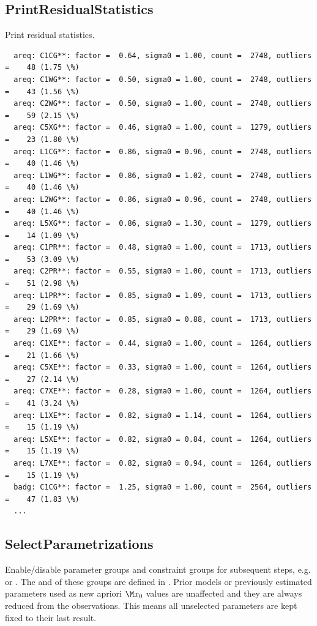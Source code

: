 \subsection{PrintResidualStatistics}\label{gnssProcessingStepType:printResidualStatistics}
Print residual statistics.
\begin{verbatim}
  areq: C1CG**: factor =  0.64, sigma0 = 1.00, count =  2748, outliers =    48 (1.75 \%)
  areq: C1WG**: factor =  0.50, sigma0 = 1.00, count =  2748, outliers =    43 (1.56 \%)
  areq: C2WG**: factor =  0.50, sigma0 = 1.00, count =  2748, outliers =    59 (2.15 \%)
  areq: C5XG**: factor =  0.46, sigma0 = 1.00, count =  1279, outliers =    23 (1.80 \%)
  areq: L1CG**: factor =  0.86, sigma0 = 0.96, count =  2748, outliers =    40 (1.46 \%)
  areq: L1WG**: factor =  0.86, sigma0 = 1.02, count =  2748, outliers =    40 (1.46 \%)
  areq: L2WG**: factor =  0.86, sigma0 = 0.96, count =  2748, outliers =    40 (1.46 \%)
  areq: L5XG**: factor =  0.86, sigma0 = 1.30, count =  1279, outliers =    14 (1.09 \%)
  areq: C1PR**: factor =  0.48, sigma0 = 1.00, count =  1713, outliers =    53 (3.09 \%)
  areq: C2PR**: factor =  0.55, sigma0 = 1.00, count =  1713, outliers =    51 (2.98 \%)
  areq: L1PR**: factor =  0.85, sigma0 = 1.09, count =  1713, outliers =    29 (1.69 \%)
  areq: L2PR**: factor =  0.85, sigma0 = 0.88, count =  1713, outliers =    29 (1.69 \%)
  areq: C1XE**: factor =  0.44, sigma0 = 1.00, count =  1264, outliers =    21 (1.66 \%)
  areq: C5XE**: factor =  0.33, sigma0 = 1.00, count =  1264, outliers =    27 (2.14 \%)
  areq: C7XE**: factor =  0.28, sigma0 = 1.00, count =  1264, outliers =    41 (3.24 \%)
  areq: L1XE**: factor =  0.82, sigma0 = 1.14, count =  1264, outliers =    15 (1.19 \%)
  areq: L5XE**: factor =  0.82, sigma0 = 0.84, count =  1264, outliers =    15 (1.19 \%)
  areq: L7XE**: factor =  0.82, sigma0 = 0.94, count =  1264, outliers =    15 (1.19 \%)
  badg: C1CG**: factor =  1.25, sigma0 = 1.00, count =  2564, outliers =    47 (1.83 \%)
  ...
\end{verbatim}


\subsection{SelectParametrizations}\label{gnssProcessingStepType:selectParametrizations}
Enable/disable parameter groups and constraint groups for subsequent steps,
e.g.  or
.
The  and  of these groups
are defined in .
Prior models or previously estimated parameters used as new apriori $\M x_0$ values are unaffected
and they are always reduced from the observations. This means all unselected parameters are kept fixed
to their last result.

